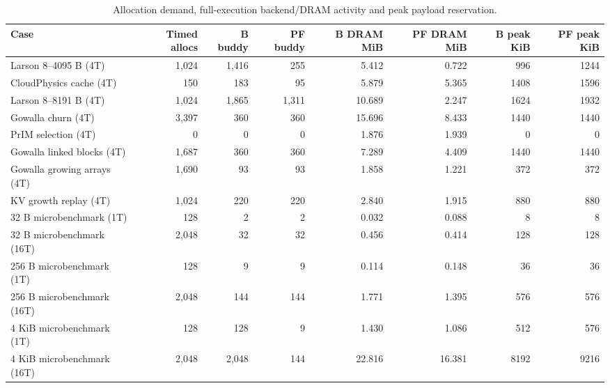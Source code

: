 \begin{table}[t]
\caption{Allocation demand, full-execution backend/DRAM activity and peak payload reservation.}\label{tab:traffic}
\centering\small
\setlength{\tabcolsep}{4.5pt}
\begin{tabular}{lrrrrrrr}\toprule
Case & Timed allocs & B buddy & PF buddy & B DRAM MiB & PF DRAM MiB & B peak KiB & PF peak KiB \\ \midrule
Larson 8--4095 B (4T) & 1,024 & 1,416 & 255 & 5.412 & 0.722 & 996 & 1244 \\
CloudPhysics cache (4T) & 150 & 183 & 95 & 5.879 & 5.365 & 1408 & 1596 \\
Larson 8--8191 B (4T) & 1,024 & 1,865 & 1,311 & 10.689 & 2.247 & 1624 & 1932 \\
Gowalla churn (4T) & 3,397 & 360 & 360 & 15.696 & 8.433 & 1440 & 1440 \\
PrIM selection (4T) & 0 & 0 & 0 & 1.876 & 1.939 & 0 & 0 \\
Gowalla linked blocks (4T) & 1,687 & 360 & 360 & 7.289 & 4.409 & 1440 & 1440 \\
Gowalla growing arrays (4T) & 1,690 & 93 & 93 & 1.858 & 1.221 & 372 & 372 \\
KV growth replay (4T) & 1,024 & 220 & 220 & 2.840 & 1.915 & 880 & 880 \\
32 B microbenchmark (1T) & 128 & 2 & 2 & 0.032 & 0.088 & 8 & 8 \\
32 B microbenchmark (16T) & 2,048 & 32 & 32 & 0.456 & 0.414 & 128 & 128 \\
256 B microbenchmark (1T) & 128 & 9 & 9 & 0.114 & 0.148 & 36 & 36 \\
256 B microbenchmark (16T) & 2,048 & 144 & 144 & 1.771 & 1.395 & 576 & 576 \\
4 KiB microbenchmark (1T) & 128 & 128 & 9 & 1.430 & 1.086 & 512 & 576 \\
4 KiB microbenchmark (16T) & 2,048 & 2,048 & 144 & 22.816 & 16.381 & 8192 & 9216 \\
\bottomrule\end{tabular}
\par\vspace{2pt}{\footnotesize Buddy counts and DRAM bytes cover the full execution; they are not timed-work counts. Peak excludes the extra 64 KiB owner map, buddy metadata and identical application tables. DRAM counters exclude WRAM and instruction fetches.}
\end{table}

